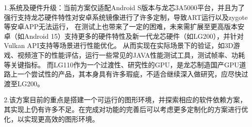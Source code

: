 1.系统及硬件升级：当前方案仅适配Android S版本与龙芯3A5000平台，并且为了强行支持龙芯硬件特性对安卓系统镜像进行了许多定制，导致ART运行以及zygote等安卓APP无法运行，
在测试上也带来了一定的困难，未来需扩展至更高版本安卓（如Android 15）支持更多的硬件特性及新一代龙芯硬件（如LG200），并针对Vulkan API支持等场景进行性能优化。
从而实现在实际场景下的验证，如3D游戏、视频渲下的性能评估，运行一些常见的JAVA性能测试工具，测试帧率、功耗等关键指标。
而LG110作为一个过渡性、研究性的GPU，是龙芯制造国产GPU道路上一个尝试性的产品，其本身具有许多瑕疵，不适合继续深入做研究，应尽快过渡至LG200。

2.该方案目前的重点是搭建一个可运行的图形环境，并探索相应的软件依赖方案，其实现上仍有许多不足。在完成对功能的完善后可以考虑更多定制化的方案进行优化，以实现更高效的图形环境。

